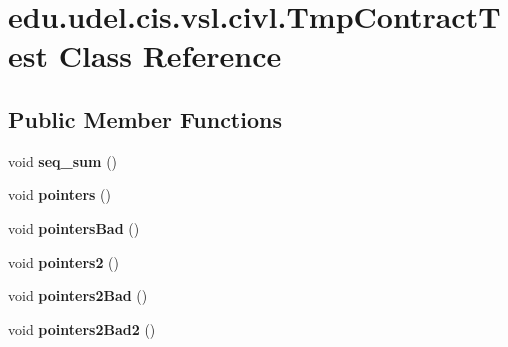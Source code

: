 \hypertarget{classedu_1_1udel_1_1cis_1_1vsl_1_1civl_1_1TmpContractTest}{}\section{edu.\+udel.\+cis.\+vsl.\+civl.\+Tmp\+Contract\+Test Class Reference}
\label{classedu_1_1udel_1_1cis_1_1vsl_1_1civl_1_1TmpContractTest}
\subsection*{Public Member Functions}
\begin{DoxyCompactItemize}
\item 
\hypertarget{classedu_1_1udel_1_1cis_1_1vsl_1_1civl_1_1TmpContractTest_abdec6ad23e83312833ad5c262c9beb70}{}void {\bfseries seq\+\_\+sum} ()\label{classedu_1_1udel_1_1cis_1_1vsl_1_1civl_1_1TmpContractTest_abdec6ad23e83312833ad5c262c9beb70}

\item 
\hypertarget{classedu_1_1udel_1_1cis_1_1vsl_1_1civl_1_1TmpContractTest_ac35c6d5b324e828a54f7fd2324b91926}{}void {\bfseries pointers} ()\label{classedu_1_1udel_1_1cis_1_1vsl_1_1civl_1_1TmpContractTest_ac35c6d5b324e828a54f7fd2324b91926}

\item 
\hypertarget{classedu_1_1udel_1_1cis_1_1vsl_1_1civl_1_1TmpContractTest_af513efd70556374e61972f28d89d9ecc}{}void {\bfseries pointers\+Bad} ()\label{classedu_1_1udel_1_1cis_1_1vsl_1_1civl_1_1TmpContractTest_af513efd70556374e61972f28d89d9ecc}

\item 
\hypertarget{classedu_1_1udel_1_1cis_1_1vsl_1_1civl_1_1TmpContractTest_a0d5ca574d50d84462ad9e78f2bcf65fa}{}void {\bfseries pointers2} ()\label{classedu_1_1udel_1_1cis_1_1vsl_1_1civl_1_1TmpContractTest_a0d5ca574d50d84462ad9e78f2bcf65fa}

\item 
\hypertarget{classedu_1_1udel_1_1cis_1_1vsl_1_1civl_1_1TmpContractTest_a12cca4342023a8348aba82b67e7e827e}{}void {\bfseries pointers2\+Bad} ()\label{classedu_1_1udel_1_1cis_1_1vsl_1_1civl_1_1TmpContractTest_a12cca4342023a8348aba82b67e7e827e}

\item 
\hypertarget{classedu_1_1udel_1_1cis_1_1vsl_1_1civl_1_1TmpContractTest_a046cb65e264449ea2cc2ec5555648354}{}void {\bfseries pointers2\+Bad2} ()\label{classedu_1_1udel_1_1cis_1_1vsl_1_1civl_1_1TmpContractTest_a046cb65e264449ea2cc2ec5555648354}


\end{DoxyCompactItemize}
